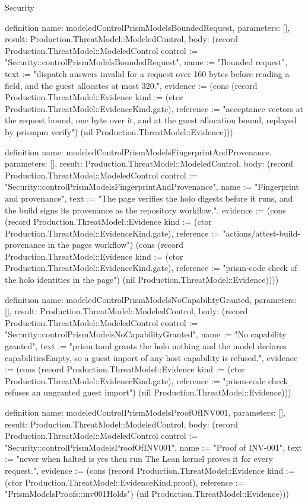 \begin{lexlean}{Security}
\begin{semanticmodule}
definition{
  name: modeledControlPrismModelsBoundedRequest,
  parameters: [],
  result: Production.ThreatModel::ModeledControl,
  body: (record Production.ThreatModel::ModeledControl {control := "Security::controlPrismModelsBoundedRequest", name := "Bounded request", text := "dispatch answers invalid for a request over 160 bytes before reading a field, and the guest allocates at most 320.", evidence := (cons (record Production.ThreatModel::Evidence {kind := (ctor Production.ThreatModel::EvidenceKind.gate), reference := "acceptance vectors at the request bound, one byte over it, and at the guest allocation bound, replayed by prismpm verify"}) (nil Production.ThreatModel::Evidence))})
}

definition{
  name: modeledControlPrismModelsFingerprintAndProvenance,
  parameters: [],
  result: Production.ThreatModel::ModeledControl,
  body: (record Production.ThreatModel::ModeledControl {control := "Security::controlPrismModelsFingerprintAndProvenance", name := "Fingerprint and provenance", text := "The page verifies the holo digests before it runs, and the build signs its provenance as the repository workflow.", evidence := (cons (record Production.ThreatModel::Evidence {kind := (ctor Production.ThreatModel::EvidenceKind.gate), reference := "actions/attest-build-provenance in the pages workflow"}) (cons (record Production.ThreatModel::Evidence {kind := (ctor Production.ThreatModel::EvidenceKind.gate), reference := "prism-code check of the holo identities in the page"}) (nil Production.ThreatModel::Evidence)))})
}

definition{
  name: modeledControlPrismModelsNoCapabilityGranted,
  parameters: [],
  result: Production.ThreatModel::ModeledControl,
  body: (record Production.ThreatModel::ModeledControl {control := "Security::controlPrismModelsNoCapabilityGranted", name := "No capability granted", text := "prism.toml grants the holo nothing and the model declares capabilitiesEmpty, so a guest import of any host capability is refused.", evidence := (cons (record Production.ThreatModel::Evidence {kind := (ctor Production.ThreatModel::EvidenceKind.gate), reference := "prism-code check refuses an ungranted guest import"}) (nil Production.ThreatModel::Evidence))})
}

definition{
  name: modeledControlPrismModelsProofOfINV001,
  parameters: [],
  result: Production.ThreatModel::ModeledControl,
  body: (record Production.ThreatModel::ModeledControl {control := "Security::controlPrismModelsProofOfINV001", name := "Proof of INV-001", text := "never when halted is yes then run The Lean kernel proves it for every request.", evidence := (cons (record Production.ThreatModel::Evidence {kind := (ctor Production.ThreatModel::EvidenceKind.proof), reference := "PrismModelsProofs::inv001Holds"}) (nil Production.ThreatModel::Evidence))})
}


\end{semanticmodule}
\end{lexlean}
